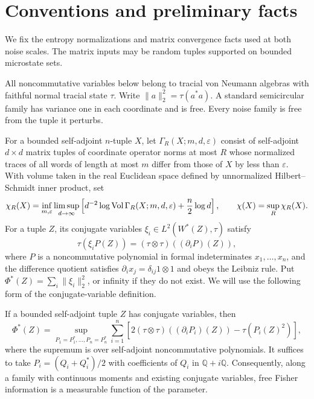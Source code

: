 \section{Conventions and preliminary facts}\label{sec:conventions}

We fix the entropy normalizations and matrix convergence facts used at
both noise scales. The matrix inputs may be random tuples supported on
bounded microstate sets.

All noncommutative variables below belong to tracial von Neumann algebras
with faithful normal tracial state $\tau$. Write $\|a\|_2^2=\tau(a^*a)$.
A standard semicircular family has variance one in each coordinate and
is free. Every noise family is free from the tuple it perturbs.

For a bounded self-adjoint $n$-tuple $X$, let
$\Gamma_R(X;m,d,\varepsilon)$ consist of self-adjoint $d\times d$ matrix
tuples of coordinate operator norms at most $R$ whose normalized traces
of all words of length at most $m$ differ from those of $X$ by less than
$\varepsilon$. With volume taken in the real Euclidean space defined by
unnormalized Hilbert--Schmidt inner product, set
\[
 \chi_R(X)=\inf_{m,\varepsilon}\limsup_{d\to\infty}
 \left[d^{-2}\log\operatorname{Vol}\Gamma_R(X;m,d,\varepsilon)
       +\frac n2\log d\right],\qquad
 \chi(X)=\sup_R\chi_R(X).
\]
For a tuple $Z$, its conjugate variables $\xi_i\in L^2(W^*(Z),\tau)$
satisfy
\[
 \tau(\xi_i P(Z))=(\tau\otimes\tau)((\partial_i P)(Z)),
\]
where $P$ is a noncommutative polynomial in formal indeterminates
$x_1,\ldots,x_n$, and the difference quotient satisfies
$\partial_i x_j=\delta_{ij}1\otimes1$ and obeys the
Leibniz rule. Put $\Phi^*(Z)=\sum_i\|\xi_i\|_2^2$, or infinity if they
do not exist. We will use the following form of the conjugate-variable
definition.

\begin{lemma}\label{lem:variational}
If a bounded self-adjoint tuple $Z$ has conjugate variables, then
\begin{equation}\label{eq:fishervariational}
 \Phi^*(Z)=\sup_{P_1=P_1^*,\ldots,P_n=P_n^*}
 \sum_{i=1}^n\left[
  2(\tau\otimes\tau)((\partial_iP_i)(Z))
  -\tau(P_i(Z)^2)\right],
\end{equation}
where the supremum is over self-adjoint noncommutative polynomials.
It suffices to take $P_i=(Q_i+Q_i^*)/2$ with coefficients of $Q_i$ in
$\mathbb Q+i\mathbb Q$. Consequently, along a family with continuous
moments and existing conjugate variables, free Fisher information is
a measurable function of the parameter.
\end{lemma}

